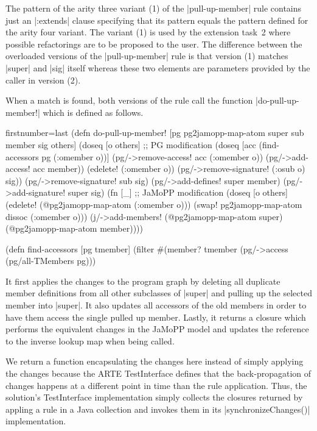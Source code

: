 \documentclass[submission]{eptcs}
\newcommand{\code}{\clojureinline}
\begin{document}
The pattern of the arity three variant (1) of the \code|pull-up-member| rule
contains just an \code|:extends| clause specifying that its pattern equals the
pattern defined for the arity four variant.  The variant (1) is used by the
extension task~2 where possible refactorings are to be proposed to the user.
The difference between the overloaded versions of the \code|pull-up-member|
rule is that version (1) matches \code|super| and \code|sig| itself whereas
these two elements are parameters provided by the caller in version (2).

When a match is found, both versions of the rule call the function
\code|do-pull-up-member!| which is defined as follows.

\begin{clojurecode*}{firstnumber=last}
(defn do-pull-up-member! [pg pg2jamopp-map-atom super sub member sig others]
  (doseq [o others]                                                 ;; PG modification
    (doseq [acc (find-accessors pg (:omember o))]
      (pg/->remove-access! acc (:omember o))
      (pg/->add-access! acc member))
    (edelete! (:omember o))
    (pg/->remove-signature! (:osub o) sig))
  (pg/->remove-signature! sub sig)
  (pg/->add-defines! super member)
  (pg/->add-signature! super sig)
  (fn [_]                                                           ;; JaMoPP modification
    (doseq [o others]
      (edelete! (@pg2jamopp-map-atom (:omember o)))
      (swap! pg2jamopp-map-atom dissoc (:omember o)))
    (j/->add-members! (@pg2jamopp-map-atom super) (@pg2jamopp-map-atom member))))

(defn find-accessors [pg tmember]
  (filter #(member? tmember (pg/->access %
          (pg/all-TMembers pg)))
\end{clojurecode*}

It first applies the changes to the program graph by deleting all duplicate
member definitions from all other subclasses of \code|super| and pulling up the
selected member into \code|super|.  It also updates all accessors of the old
members in order to have them access the single pulled up member.  Lastly, it
returns a closure which performs the equivalent changes in the JaMoPP model and
updates the reference to the inverse lookup map when being called.

We return a function encapsulating the changes here instead of simply applying
the changes because the ARTE \textsf{TestInterface} defines that the
back-propagation of changes happens at a different point in time than the rule
application.  Thus, the solution's \textsf{TestInterface} implementation simply
collects the closures returned by appling a rule in a Java collection and
invokes them in its \code|synchronizeChanges()| implementation.
\end{document}
